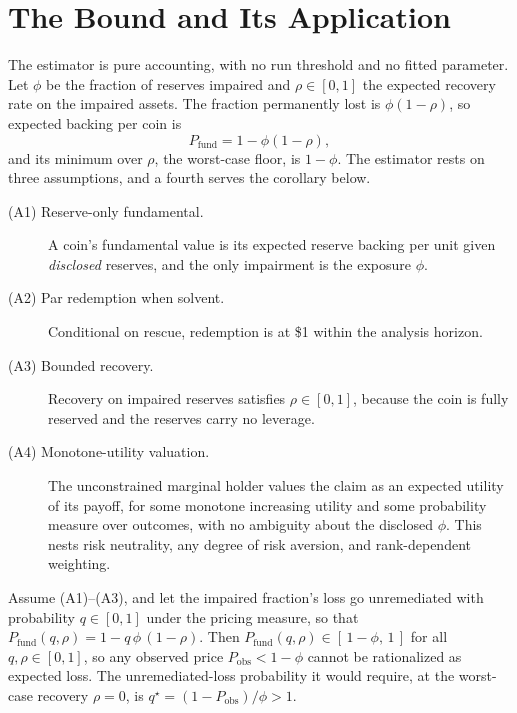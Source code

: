 \section{The Bound and Its Application}
\label{sec:ident}

The estimator is pure accounting, with no run threshold and no fitted parameter. Let
$\phi$ be the fraction of reserves impaired and $\rho\in[0,1]$ the expected recovery rate
on the impaired assets. The fraction permanently lost is $\phi(1-\rho)$, so expected
backing per coin is
\begin{equation}
P_{\mathrm{fund}} = 1 - \phi(1-\rho),
\end{equation}
and its minimum over $\rho$, the worst-case floor, is $1-\phi$. The estimator rests on
three assumptions, and a fourth serves the corollary below.

\begin{description}
\item[(A1) Reserve-only fundamental.] A coin's fundamental value is its expected reserve
  backing per unit given \emph{disclosed} reserves, and the only impairment is the
  exposure $\phi$.
\item[(A2) Par redemption when solvent.] Conditional on rescue, redemption is at \$1
  within the analysis horizon.
\item[(A3) Bounded recovery.] Recovery on impaired reserves satisfies $\rho\in[0,1]$,
  because the coin is fully reserved and the reserves carry no leverage.
\item[(A4) Monotone-utility valuation.] The unconstrained marginal holder values the claim
  as an expected utility of its payoff, for some monotone increasing utility and some
  probability measure over outcomes, with no ambiguity about the disclosed $\phi$. This nests risk neutrality, any degree of risk
  aversion, and rank-dependent weighting.
\end{description}

\begin{proposition}
\label{prop:floor}
Assume \textup{(A1)--(A3)}, and let the impaired fraction's loss go unremediated with
probability $q\in[0,1]$ under the pricing measure, so that
$P_{\mathrm{fund}}(q,\rho)=1-q\,\phi\,(1-\rho)$. Then
$P_{\mathrm{fund}}(q,\rho)\in[\,1-\phi,\,1\,]$ for all $q,\rho\in[0,1]$, so any observed
price $P_{\mathrm{obs}}<1-\phi$ cannot be rationalized as expected loss. The
unremediated-loss probability it would require, at the worst-case recovery $\rho=0$, is
$q^{\star}=(1-P_{\mathrm{obs}})/\phi>1$.
\end{proposition}

